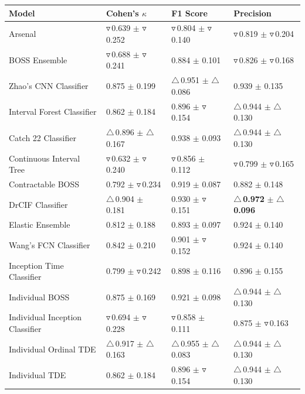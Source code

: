 \documentclass[final,3p,times,twocolumn]{elsarticle}
\begin{document}
\begin{table}[t!]
{\begin{tabular}{llll}
\toprule
Model & Cohen's $\kappa$ & F1 Score & Precision \\
\midrule
Arsenal & $\triangledown$\,0.639 $\pm$ $\triangledown$\,0.252 & $\triangledown$\,0.804 $\pm$ $\triangledown$\,0.140 & $\triangledown$\,0.819 $\pm$ $\triangledown$\,0.204 \\
BOSS Ensemble & $\triangledown$\,0.688 $\pm$ $\triangledown$\,0.241 & 0.884 $\pm$ 0.101 & $\triangledown$\,0.826 $\pm$ $\triangledown$\,0.168 \\
Zhao's CNN Classifier & 0.875 $\pm$ 0.199 & $\triangle$\,0.951 $\pm$ $\triangle$\,0.086 & 0.939 $\pm$ 0.135 \\
Interval Forest Classifier & 0.862 $\pm$ 0.184 & 0.896 $\pm$ $\triangledown$\,0.154 & $\triangle$\,0.944 $\pm$ $\triangle$\,0.130 \\
Catch 22 Classifier & $\triangle$\,0.896 $\pm$ $\triangle$\,0.167 & 0.938 $\pm$ 0.093 & $\triangle$\,0.944 $\pm$ $\triangle$\,0.130 \\
Continuous Interval Tree & $\triangledown$\,0.632 $\pm$ $\triangledown$\,0.240 & $\triangledown$\,0.856 $\pm$ 0.112 & $\triangledown$\,0.799 $\pm$ $\triangledown$\,0.165 \\
Contractable BOSS & 0.792 $\pm$ $\triangledown$\,0.234 & 0.919 $\pm$ 0.087 & 0.882 $\pm$ 0.148 \\
DrCIF Classifier & $\triangle$\,0.904 $\pm$ 0.181 & 0.930 $\pm$ $\triangledown$\,0.151 & \textbf{$\triangle$\,0.972} $\pm$ \textbf{$\triangle$\,0.096} \\
Elastic Ensemble & 0.812 $\pm$ 0.188 & 0.893 $\pm$ 0.097 & 0.924 $\pm$ 0.140 \\
Wang's FCN Classifier & 0.842 $\pm$ 0.210 & 0.901 $\pm$ $\triangledown$\,0.152 & 0.924 $\pm$ 0.140 \\
Inception Time Classifier & 0.799 $\pm$ $\triangledown$\,0.242 & 0.898 $\pm$ 0.116 & 0.896 $\pm$ 0.155 \\
Individual BOSS & 0.875 $\pm$ 0.169 & 0.921 $\pm$ 0.098 & $\triangle$\,0.944 $\pm$ $\triangle$\,0.130 \\
Individual Inception Classifier & $\triangledown$\,0.694 $\pm$ $\triangledown$\,0.228 & $\triangledown$\,0.858 $\pm$ 0.111 & 0.875 $\pm$ $\triangledown$\,0.163 \\
Individual Ordinal TDE & $\triangle$\,0.917 $\pm$ $\triangle$\,0.163 & $\triangle$\,0.955 $\pm$ $\triangle$\,0.083 & $\triangle$\,0.944 $\pm$ $\triangle$\,0.130 \\
Individual TDE & 0.862 $\pm$ 0.184 & 0.896 $\pm$ $\triangledown$\,0.154 & $\triangle$\,0.944 $\pm$ $\triangle$\,0.130 \\

\end{tabular}}
\end{table}
\end{document}
